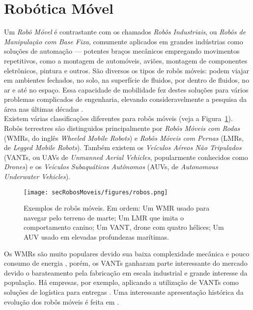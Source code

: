\section{Robótica Móvel\label{sec:robos}}

Um \textit{Robô Móvel} é contrastante com os chamados \textit{Robôs Industriais}, ou \textit{Robôs de Manipulação com Base Fixa}, comumente aplicados em grandes indústrias como soluções de automação --- potentes braços mecânicos empregando movimentos repetitivos, como a montagem de automóveis, aviões, montagem de componentes eletrônicos, pintura e outros.  São diversos os tipos de robôs móveis: podem viajar em ambientes fechados, no solo, na superfície de fluidos, por dentro de fluidos, no ar e até no espaço. Essa capacidade de mobilidade fez destes soluções para vários problemas complicados de engenharia, elevando consideravelmente a pesquisa da área nas últimas décadas \cite{mobileRobotsCook}.
\\

Existem várias classificações diferentes para robôs móveis \cite{mobileRobotsTzafestas} (veja a Figura~\ref{fig:robosmoveis}). Robôs terrestres são distinguidos principalmente por \textit{Robôs Móveis com Rodas} (WMRs, do inglês \textit{Wheeled Mobile Robots}) e \textit{Robôs Móveis com Pernas} (LMRs, de \textit{Legged Mobile Robots}). Também existem os \textit{Veículos Aéreos Não Tripulados} (VANTs, ou UAVs de \textit{Unmanned Aerial Vehicles}, popularmente conhecidos como \textit{Drones}) e os \textit{Veículos Subaquáticos Autônomos} (AUVs, de \textit{Autonomous Underwater Vehicles}). 

\begin{figure}[H]
	\begin{center}
		\texttt{[image: secRobosMoveis/figures/robos.png]}
	\end{center}
	\caption{Exemplos de robôs móveis. Em ordem: Um WMR usado para navegar pelo terreno de marte; Um LMR que imita o comportamento canino; Um VANT, drone com quatro hélices; Um AUV usado em elevadas profundezas marítimas.}
	\label{fig:robosmoveis}
\end{figure}

Os WMRs são muito populares devido sua baixa complexidade mecânica e pouco consumo de energia \cite{mobileRobotsWheeled}, porém, os VANTs ganharam parte interessante do mercado devido o barateamento pela fabricação em escala industrial e grande interesse da população. Há empresas, por exemplo, aplicando a utilização de VANTs como soluções de logística para entregas \cite{dronesAmazon}. Uma interessante apresentação histórica da evolução dos robôs móveis é feita em \cite{mobileRobotsTzafestas}.

